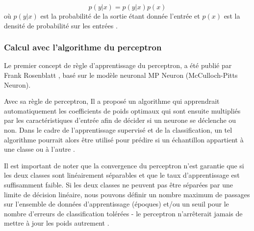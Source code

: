 $$
p(y|x) = p(y|x)p(x)
$$
où $p(y|x)$ est la probabilité de la sortie étant donnée l'entrée et $p(x)$ est la densité de probabilité sur les entrées \cite{matloff2017statistical}.





	\subsubsection{Calcul avec l'algorithme du perceptron}

Le premier concept de règle d'apprentissage du perceptron, a été publié par Frank Rosenblatt \cite{antoine2018apprentissage}, basé sur le modèle neuronal MP Neuron (McCulloch-Pitts Neuron). 


Avec sa règle de perceptron, Il a proposé un algorithme qui apprendrait automatiquement les coefficients de poids optimaux qui sont ensuite multipliés par les caractéristiques d'entrée afin de décider si un neurone se déclenche ou non. Dans le cadre de l'apprentissage supervisé et de la classification, un tel algorithme pourrait alors être utilisé pour prédire si un échantillon appartient à une classe ou à l'autre \cite{ml2008python}.

Il est important de noter que la convergence du perceptron n'est garantie que si les deux classes sont linéairement séparables et que le taux d'apprentissage %
est suffisamment faible. Si les deux classes ne peuvent pas être séparées par une limite de décision linéaire, nous pouvons définir un nombre maximum de passages sur l'ensemble de données d'apprentissage (époques) et/ou un seuil pour le nombre d'erreurs de classification tolérées - le perceptron n'arrêterait jamais de mettre à jour les poids autrement \cite{freund1999large, ml2008python}.

